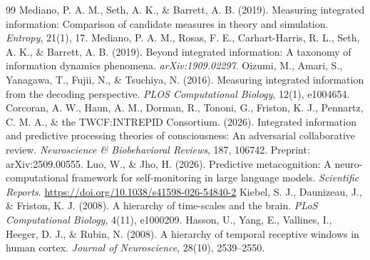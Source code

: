 \documentclass[11pt]{article}
\begin{document}
\begin{thebibliography}{99}
 Mediano, P. A. M., Seth, A. K., \& Barrett, A. B. (2019). Measuring integrated information: Comparison of candidate measures in theory and simulation. \emph{Entropy}, 21(1), 17.
 Mediano, P. A. M., Rosas, F. E., Carhart-Harris, R. L., Seth, A. K., \& Barrett, A. B. (2019). Beyond integrated information: A taxonomy of information dynamics phenomena. \emph{arXiv:1909.02297}.
 Oizumi, M., Amari, S., Yanagawa, T., Fujii, N., \& Tsuchiya, N. (2016). Measuring integrated information from the decoding perspective. \emph{PLOS Computational Biology}, 12(1), e1004654.
 Corcoran, A. W., Haun, A. M., Dorman, R., Tononi, G., Friston, K. J., Pennartz, C. M. A., \& the TWCF:INTREPID Consortium. (2026). Integrated information and predictive processing theories of consciousness: An adversarial collaborative review. \emph{Neuroscience \& Biobehavioral Reviews}, 187, 106742. Preprint: arXiv:2509.00555.
 Luo, W., \& Jho, H. (2026). Predictive metacognition: A neuro-computational framework for self-monitoring in large language models. \emph{Scientific Reports}. \url{https://doi.org/10.1038/s41598-026-54840-2}
 Kiebel, S. J., Daunizeau, J., \& Friston, K. J. (2008). A hierarchy of time-scales and the brain. \emph{PLoS Computational Biology}, 4(11), e1000209.
 Hasson, U., Yang, E., Vallines, I., Heeger, D. J., \& Rubin, N. (2008). A hierarchy of temporal receptive windows in human cortex. \emph{Journal of Neuroscience}, 28(10), 2539--2550.
\end{thebibliography}
\end{document}

